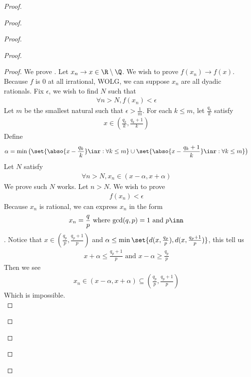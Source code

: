 \documentclass{report}
\begin{document}
\begin{proof}
\begin{proof}
\begin{proof}
\begin{proof}
\begin{question}{}{}
\end{question}
\begin{proof}
  We prove . Let $x_n \to x \in \R\setminus \Q$. We wish to prove $f(x_n) \to f(x)$. Because $f$ is  $0$ at all irrational, WOLG, we can suppose $x_n$ are all dyadic rationals. Fix $\epsilon $, we wish to find $N$ such that 
   \begin{align*}
  \forall n>N, f(x_n)<\epsilon 
  \end{align*}
Let $m$ be the smallest natural such that  $\epsilon >\frac{1}{m}$. For each $k\leq m$, let $\frac{q_k}{k}$ satisfy 
\begin{align*}
x\in (\frac{q_k}{k},\frac{q_k+1}{k})
\end{align*}
Define 
\begin{align*}
  \alpha = \min \big(\set{\abso{x-\frac{q_k}{k}}\inr:\forall k\leq m} \cup \set{\abso{x-\frac{q_k+1}{k}}\inr:\forall k\leq m}\big) 
\end{align*}
Let $N$ satisfy 
 \begin{align*}
\forall n>N, x_n\in (x-\alpha ,x+\alpha )
\end{align*}
We prove such $N$ works. Let $n>N$. We wish to prove 
\begin{align*}
f(x_n)<\epsilon 
\end{align*}
Because $x_n$ is rational, we can express $x_n$ in the form 
\begin{align*}
x_n=\frac{q}{p}\text{ where gcd$(q,p)=1$ and $p\inn $} 
\end{align*}
. Notice that $x\in (\frac{q_p}{p},\frac{q_p+1}{p})$ and $\alpha \leq \min \set{d(x,\frac{q_p}{p}),d(x,\frac{q_p+1}{p})}$, this tell us 
\begin{align*}
x+\alpha \leq \frac{q_p+1}{p}\text{ and }x-\alpha \geq \frac{q_p}{p}
\end{align*}
Then we see 
\begin{align*}
x_n\in (x-\alpha ,x+\alpha )\subseteq (\frac{q_p}{p},\frac{q_p+1}{p})
\end{align*}
Which is impossible. \CaC\\


\end{proof}
\end{proof}
\end{proof}
\end{proof}
\end{proof}
\end{document}
